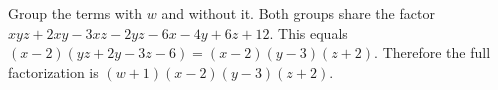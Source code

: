 Group the terms with $w$ and without it. Both groups share the factor $xyz+2xy-3xz-2yz-6x-4y+6z+12$. This equals $(x-2)(yz+2y-3z-6)=(x-2)(y-3)(z+2)$. Therefore the full factorization is $\boxed{(w+1)(x-2)(y-3)(z+2)}$.
